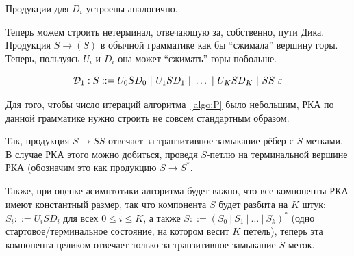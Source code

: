 Продукции для $D_i$ устроены аналогично.

Теперь можем строить нетерминал, отвечающую за, собственно, пути Дика. Продукция $S \to ( S )$ в обычной грамматике как бы ``сжимала'' вершину горы. Теперь, пользуясь $U_i$ и $D_i$ она может ``сжимать'' горы побольше.

\begin{equation}\label{eq:S}
  \mathcal{D}_1 : S ::= U_0 S D_0~|~U_1 S D_1~|~ \dots ~|~U_K S D_K~|~SS~\varepsilon
\end{equation}


Для того, чтобы число итераций алгоритма~\ref{algo:P} было небольшим, РКА по данной грамматике нужно строить не совсем стандартным образом.

Так, продукция $S \to SS$ отвечает за транзитивное замыкание рёбер с $S$-метками. В случае РКА этого можно добиться, проведя $S$-петлю на терминальной вершине РКА (обозначим это как продукцию $S \to S^*$.

Также, при оценке асимптотики алгоритма будет важно, что все компоненты РКА имеют константный размер, так что компонента $S$ будет разбита на $K$ штук: $S_i ::= U_i S D_i$ для всех $0 \le i \le K$, а также $S ::= (S_0~|~S_1~|~ \dots ~|~ S_k)^*$ (одно стартовое/терминальное состояние, на котором весит $K$ петель), теперь эта компонента целиком отвечает только за транзитивное замыкание $S$-меток.




